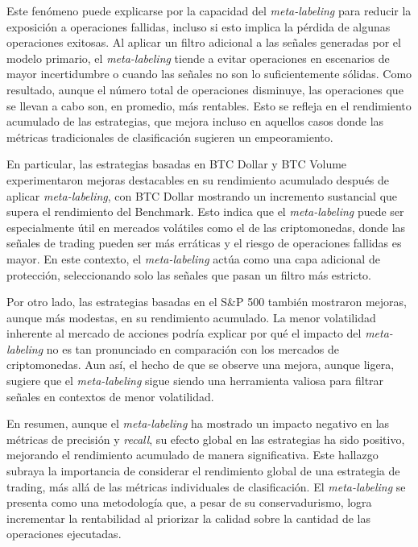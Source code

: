 \documentclass[a4paper,12pt, twoside]{report}
\begin{document}
Este fenómeno puede explicarse por la capacidad del \textit{meta-labeling} para reducir la exposición 
a operaciones fallidas, incluso si esto implica la pérdida de algunas operaciones exitosas. Al aplicar 
un filtro adicional a las señales generadas por el modelo primario, el \textit{meta-labeling} tiende a 
evitar operaciones en escenarios de mayor incertidumbre o cuando las señales no son lo suficientemente 
sólidas. Como resultado, aunque el número total de operaciones disminuye, las operaciones que se llevan 
a cabo son, en promedio, más rentables. Esto se refleja en el rendimiento acumulado de las estrategias, 
que mejora incluso en aquellos casos donde las métricas tradicionales de clasificación sugieren un 
empeoramiento.

En particular, las estrategias basadas en BTC Dollar y BTC Volume experimentaron mejoras destacables 
en su rendimiento acumulado después de aplicar \textit{meta-labeling}, con BTC Dollar mostrando un 
incremento sustancial que supera el rendimiento del Benchmark. Esto indica que el \textit{meta-labeling} 
puede ser especialmente útil en mercados volátiles como el de las criptomonedas, donde las señales de 
trading pueden ser más erráticas y el riesgo de operaciones fallidas es mayor. En este contexto, el 
\textit{meta-labeling} actúa como una capa adicional de protección, seleccionando solo las señales 
que pasan un filtro más estricto.

Por otro lado, las estrategias basadas en el S\&P 500 también mostraron mejoras, aunque más modestas, 
en su rendimiento acumulado. La menor volatilidad inherente al mercado de acciones podría explicar 
por qué el impacto del \textit{meta-labeling} no es tan pronunciado en comparación con los mercados 
de criptomonedas. Aun así, el hecho de que se observe una mejora, aunque ligera, sugiere que el 
\textit{meta-labeling} sigue siendo una herramienta valiosa para filtrar señales en contextos 
de menor volatilidad.

En resumen, aunque el \textit{meta-labeling} ha mostrado un impacto negativo en las métricas 
de precisión y \textit{recall}, su efecto global en las estrategias ha sido positivo, 
mejorando el rendimiento acumulado de manera significativa. Este hallazgo subraya la 
importancia de considerar el rendimiento global de una estrategia de trading, más allá de 
las métricas individuales de clasificación. El \textit{meta-labeling} se presenta como una 
metodología que, a pesar de su conservadurismo, logra incrementar la rentabilidad al priorizar 
la calidad sobre la cantidad de las operaciones ejecutadas.
\end{document}
